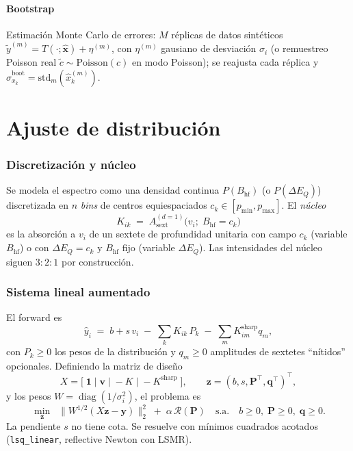 \documentclass[11pt,a4paper]{article}
\newcommand{\BHF}{B_{\mathrm{hf}}}
\newcommand{\dEQ}{\Delta E_{Q}}
\newcommand{\code}[1]{\texttt{\small #1}}
\DeclareMathOperator{\diag}{diag}
\begin{document}
\subsection{Bootstrap}
Estimación Monte Carlo de errores: $M$ réplicas de datos sintéticos
$\tilde y^{(m)}=T(\cdot;\hat{\bm x})+\eta^{(m)}$, con $\eta^{(m)}$ gausiano de
desviación $\sigma_i$ (o remuestreo Poisson real
$\tilde c\sim\mathrm{Poisson}(\hat c)$ en modo Poisson); se reajusta cada réplica y
$\hat\sigma_{x_k}^{\text{boot}}=\mathrm{std}_m(\hat x_k^{(m)})$.

\part{Ajuste de distribución}

\section{Discretización y núcleo}\label{sec:dist-kernel}

Se modela el espectro como una densidad continua $P(\BHF)$ (o $P(\dEQ)$)
discretizada en $n$ \emph{bins} de centros equiespaciados
$c_k\in[p_{\min},p_{\max}]$. El \emph{núcleo}
\begin{equation}
  K_{ik} \;=\; A_{\text{sext}}^{(d=1)}\bigl(v_i;\;\BHF=c_k\bigr)
\end{equation}
es la absorción a $v_i$ de un sextete de profundidad unitaria con campo $c_k$
(variable $\BHF$) o con $\dEQ=c_k$ y $\BHF$ fijo (variable $\dEQ$). Las
intensidades del núcleo siguen $3{:}2{:}1$ por construcción.

\section{Sistema lineal aumentado}\label{sec:dist-system}

El forward es
\begin{equation}
  \hat y_i \;=\; b + s\,v_i \;-\; \sum_{k}K_{ik}\,P_k \;-\;\sum_{m}K^{\text{sharp}}_{im}q_m,
\end{equation}
con $P_k\ge0$ los pesos de la distribución y $q_m\ge0$ amplitudes de sextetes
``nítidos'' opcionales. Definiendo la matriz de diseño
\begin{equation}
  X = \bigl[\;\bm 1\;\big|\;\bm v\;\big|\;{-}K\;\big|\;{-}K^{\text{sharp}}\;\bigr],
  \qquad \bm z=(b,s,\bm P^\top,\bm q^\top)^\top,
\end{equation}
y los pesos $W=\diag(1/\sigma_i^2)$, el problema es
\begin{equation}
  \boxed{\;
  \min_{\bm z}\;\;\bigl\|W^{1/2}(X\bm z-\bm y)\bigr\|_2^2 \;+\; \alpha\,\mathcal R(\bm P)
  \quad\text{s.a.}\quad b\ge0,\;\bm P\ge0,\;\bm q\ge0.\;}
  \label{eq:dist-min}
\end{equation}
La pendiente $s$ no tiene cota. Se resuelve con mínimos cuadrados acotados
(\code{lsq\_linear}, reflective Newton con LSMR).
\end{document}
